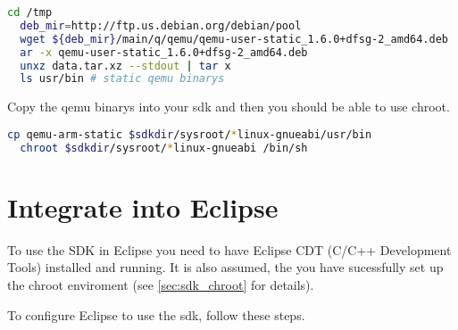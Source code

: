 \begin{lstlisting}[language=bash]
  cd /tmp
  deb_mir=http://ftp.us.debian.org/debian/pool
  wget ${deb_mir}/main/q/qemu/qemu-user-static_1.6.0+dfsg-2_amd64.deb
  ar -x qemu-user-static_1.6.0+dfsg-2_amd64.deb
  unxz data.tar.xz --stdout | tar x
  ls usr/bin # static qemu binarys
\end{lstlisting}

Copy the qemu binarys into your sdk and then you should be able to use chroot.
\begin{lstlisting}[language=bash]
  cp qemu-arm-static $sdkdir/sysroot/*linux-gnueabi/usr/bin
  chroot $sdkdir/sysroot/*linux-gnueabi /bin/sh
\end{lstlisting}

\section{Integrate into Eclipse}
\label{sec:sdk_eclipse}

To use the SDK in Eclipse you need to have Eclipse CDT (C/C++ Development Tools)
installed and running. It is also assumed, the you have sucessfully set up the
chroot enviroment (see \autoref{sec:sdk_chroot} for details).

To configure Eclipse to use the sdk, follow these steps.

